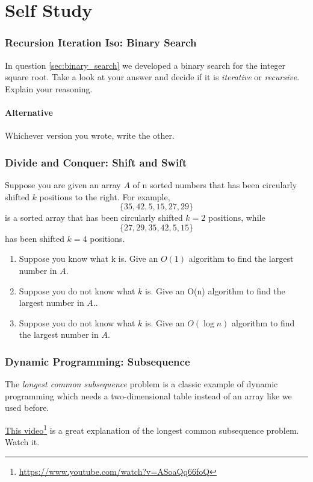 \documentclass[twoside=false,DIV=14]{scrartcl}
\begin{document}
\newpage\setcounter{section}{0}
\part*{Self Study}

\section{Recursion Iteration Iso: Binary Search}
In question \ref{sec:binary_search} we developed a binary search for the integer square root.  Take a look at your answer and decide if it is \emph{iterative} or \emph{recursive}.  Explain your reasoning.

\subsection{Alternative}
Whichever version you wrote, write the other.

\section{Divide and Conquer: Shift and Swift}
Suppose you are given an array $A$ of n sorted numbers that has been circularly shifted $k$ positions to the right. For example, 
\[
\{ 35, 42, 5, 15, 27, 29\}
\]
is a sorted array that has been circularly shifted $k = 2$ positions, while 
\[
\{27, 29, 35, 42, 5, 15\}
\]
has been shifted $k = 4$ positions.
      
\begin{enumerate}
    \item Suppose you know what k is. Give an $O(1)$ algorithm to find the largest number in $A$.
    \item  Suppose you do not know what $k$ is. Give an O(n) algorithm to find the largest number in $A$..
    \item Suppose you do not know what $k$ is. Give an $O(\log n)$ algorithm to find the largest number in $A$.
\end{enumerate}

\section{Dynamic Programming: Subsequence}
The \emph{longest common subsequence} problem is a classic example of dynamic programming which needs a two-dimensional table instead of an array like we used before.

\href{https://www.youtube.com/watch?v=ASoaQq66foQ}{This video}\footnote{\url{https://www.youtube.com/watch?v=ASoaQq66foQ}} is a great explanation of the longest common subsequence problem.  Watch it.
\end{document}

